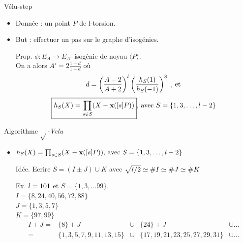 \documentclass{beamer}
\begin{document}
\begin{frame}[fragile]{Vélu-step}
\begin{itemize}
	\item Donnée : un point $P$ de l-torsion.
	\item But : effectuer un pas sur le graphe d'isogénies.
	\item[Prop.]{$\phi:E_A\rightarrow E_{A'}$ isogénie de noyau $\langle P \rangle$.\\
		On a alors $\boxed{A'=2\frac{1+d}{1-d}}$ où\\
		\[d = \left(\frac{A-2}{A+2}\right)^{\mathnormal{l}} \left( \frac{h_S(1)}{h_S(-1)}\right)^8 \text{ , et}\]
			\[\boxed{h_S(X) = \prod_{s\in S}(X-\textbf{x}([s]P))}\text{, avec }S=\{1,3, \ldots, \mathnormal{l}-2\}\]}
\end{itemize}
\end{frame}

\begin{frame}[fragile]{Algorithme $\sqrt{}$\textit{-Velu}}
	\begin{itemize}
		\item{$h_S(X) = \prod_{s\in S}(X-\textbf{x}([s]P))\text{, avec }S=\{1,3, \ldots, \mathnormal{l}-2\}$}
		\item[Idée.] {Ecrire $S=(I\pm J) \cup K$} avec $\sqrt{\mathnormal{l}/2}\simeq \#I \simeq \#J \simeq \#K$
		\vfill
		\item[Ex.]	$\mathnormal{l} = 101$ et $S = \lbrace 1, 3, \ldots 99 \rbrace$.\\
		$I = \lbrace 8, 24, 40, 56, 72, 88 \rbrace $\\
		$J = \lbrace1, 3, 5, 7 \rbrace $\\
		$K = \lbrace 97, 99 \rbrace $\\

		\[\begin{array}{rcccl}
			I\pm J =& \{8\}\pm J & \cup & \{24\}\pm J & \cup \ldots \\
			=&  {\scriptstyle \lbrace 1, 3, 5, 7, 9, 11, 13, 15\rbrace } & \cup &  {\scriptstyle \lbrace 17, 19, 21, 23, 25, 27, 29, 31\rbrace } & \cup \ldots
		\end{array}\]
	\end{itemize}
\end{frame}
\end{document}
